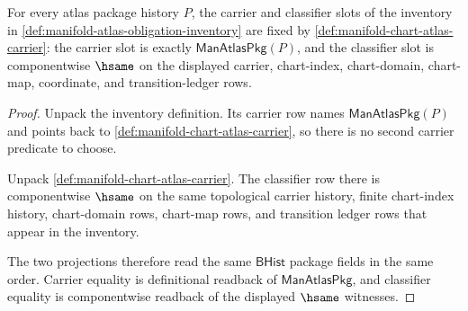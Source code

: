 \begin{theorem}
\label{thm:manifold-atlas-carrier-classifier-obligation}
For every atlas package history $P$, the carrier and classifier slots of the
inventory in \autoref{def:manifold-atlas-obligation-inventory} are fixed by
\autoref{def:manifold-chart-atlas-carrier}: the carrier slot is exactly
$\mathsf{ManAtlasPkg}(P)$, and the classifier slot is componentwise $\hsame$
on the displayed carrier, chart-index, chart-domain, chart-map, coordinate,
and transition-ledger rows.
\end{theorem}
\begin{proof}
Unpack the inventory definition. Its carrier row names
$\mathsf{ManAtlasPkg}(P)$ and points back to
\autoref{def:manifold-chart-atlas-carrier}, so there is no second carrier
predicate to choose.

Unpack \autoref{def:manifold-chart-atlas-carrier}. The classifier row there is
componentwise $\hsame$ on the same topological carrier history, finite
chart-index history, chart-domain rows, chart-map rows, and transition ledger
rows that appear in the inventory.

The two projections therefore read the same $\mathsf{BHist}$ package fields in
the same order. Carrier equality is definitional readback of
$\mathsf{ManAtlasPkg}$, and classifier equality is componentwise readback of
the displayed $\hsame$ witnesses.
\end{proof}

